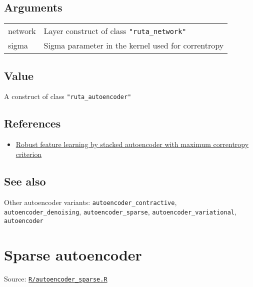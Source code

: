 \hypertarget{arguments}{\subsection{\texorpdfstring{\protect\hyperlink{arguments}{}Arguments}{Arguments}}\label{arguments}}

\begin{longtable}[c]{@{}ll@{}}
\toprule
network & Layer construct of class
\texttt{"ruta\_network"}\tabularnewline
sigma & Sigma parameter in the kernel used for
correntropy\tabularnewline
\bottomrule
\end{longtable}

\hypertarget{value}{\subsection{\texorpdfstring{\protect\hyperlink{value}{}Value}{Value}}\label{value}}

A construct of class \texttt{"ruta\_autoencoder"}

\hypertarget{references}{\subsection{\texorpdfstring{\protect\hyperlink{references}{}References}{References}}\label{references}}

\begin{itemize}
\tightlist
\item
  \href{https://ieeexplore.ieee.org/abstract/document/6854900/}{Robust
  feature learning by stacked autoencoder with maximum correntropy
  criterion}
\end{itemize}

\hypertarget{see-also}{\subsection{\texorpdfstring{\protect\hyperlink{see-also}{}See
also}{See also}}\label{see-also}}

Other autoencoder variants: \texttt{autoencoder\_contractive},
\texttt{autoencoder\_denoising}, \texttt{autoencoder\_sparse},
\texttt{autoencoder\_variational}, \texttt{autoencoder}

\section{Sparse autoencoder}\label{sparse-autoencoder}

Source:
\href{https://github.com/fdavidcl/ruta/blob/master/R/autoencoder_sparse.R}{\texttt{R/autoencoder\_sparse.R}}

